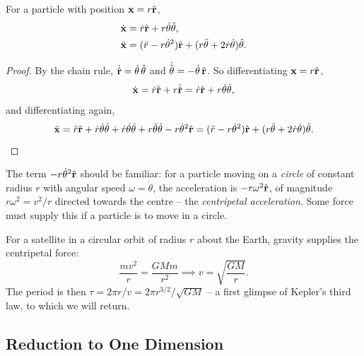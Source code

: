 \documentclass[a4paper]{scrartcl}
\newcommand{\hh}[1]{\hat{\vv{#1}}}
\begin{document}
\begin{proposition}
	For a particle with position $\vv x = r \hh r$,
	\begin{align*}
		\dot{\vv x} &= \dot{r} \hh r + r \dot{\theta} \hh \theta, \\
		\ddot{\vv x} &= (\ddot{r} - r \dot{\theta}^2)\hh r + (r \ddot{\theta} + 2 \dot{r}\dot{\theta}) \hh \theta.
	\end{align*}
\end{proposition}
\begin{proof}
	By the chain rule, $\dot{\hh r} = \dot\theta \, \hh \theta$ and $\dot{\hh \theta} = -\dot\theta\, \hh r$. So differentiating $\vv x = r \hh r$,
	$$
	\dot{\vv x} = \dot{r}\hh r + r \dot{\hh r} = \dot{r} \hh r + r \dot{\theta} \hh \theta,
	$$
	and differentiating again,
	\[
	\ddot{\vv x} = \ddot{r} \hh r + \dot{r}\dot{\theta} \hh\theta + \dot{r}\dot\theta \hh \theta + r \ddot{\theta}\hh\theta - r \dot{\theta}^2 \hh r = (\ddot{r} - r \dot\theta^2)\hh r + (r \ddot\theta + 2 \dot{r}\dot\theta)\hh\theta. \qedhere
	\]
\end{proof}

The term $-r\dot\theta^2 \hh r$ should be familiar: for a particle moving on a \emph{circle} of constant radius $r$ with angular speed $\omega = \dot\theta$, the acceleration is $-r\omega^2 \hh r$, of magnitude $r\omega^2 = v^2/r$ directed towards the centre -- the \emph{centripetal acceleration}. Some force must supply this if a particle is to move in a circle.

\begin{example}
	For a satellite in a circular orbit of radius $r$ about the Earth, gravity supplies the centripetal force:
	$$
	\frac{mv^2}{r} = \frac{GMm}{r^2} \implies v = \sqrt{\frac{GM}{r}}.
	$$
	The period is then $\tau = 2\pi r / v = 2\pi r^{3/2}/\sqrt{GM}$ -- a first glimpse of Kepler's third law, to which we will return.
\end{example}

\subsection{Reduction to One Dimension}
\end{document}
